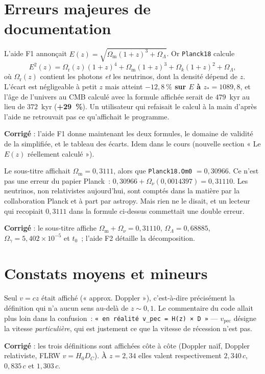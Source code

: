 \documentclass[11pt,a4paper]{report}
\newcommand{\Ok}{\Omega_{k}}
\newcommand{\Om}{\Omega_{\mathrm{m}}}
\newcommand{\OL}{\Omega_{\Lambda}}
\newcommand{\Or}{\Omega_{\mathrm{r}}}
\newcommand{\Hzero}{H_{0}}
\begin{document}
\section{Erreurs majeures de documentation}

\begin{tcolorbox}[majeur,title={P1 --- la formule $E(z)$ affichée n'est pas celle utilisée}]
L'aide F1 annonçait
$E(z) = \sqrt{\Om(1+z)^{3} + \OL}$. Or \texttt{Planck18} calcule
\[
E^{2}(z) = \Or(z)(1+z)^{4} + \Om(1+z)^{3} + \Ok(1+z)^{2} + \OL ,
\]
où $\Or(z)$ contient les photons \emph{et} les neutrinos, dont la densité
dépend de $z$. L'écart est négligeable à petit $z$ mais atteint
\textbf{$-12{,}8~\%$ sur $E$ à $z_{*} = 1089{,}8$}, et l'âge de l'univers au CMB
calculé avec la formule affichée serait de $479$~kyr au lieu de $372$~kyr
(\textbf{+29~\%}). Un utilisateur qui refaisait le calcul à la main d'après
l'aide ne retrouvait pas ce qu'affichait le programme.

\medskip
\textbf{Corrigé} : l'aide F1 donne maintenant les deux formules, le domaine de
validité de la simplifiée, et le tableau des écarts. Idem dans le cours
(nouvelle section « Le $E(z)$ réellement calculé »).
\end{tcolorbox}

\begin{tcolorbox}[majeur,title={P2 --- « $\Om = 0{,}3111$ » n'est pas le $\Om$ du backend}]
Le sous-titre affichait $\Om = 0{,}3111$, alors que
\texttt{Planck18.Om0} $= 0{,}30966$. Ce n'est pas une erreur du papier Planck~:
$0{,}30966 + \Omega_{\nu}(0{,}0014397) = 0{,}31110$. Les neutrinos, non
relativistes aujourd'hui, sont comptés dans la matière par la collaboration
Planck et à part par astropy. Mais rien ne le disait, et un lecteur qui
recopiait $0{,}3111$ dans la formule ci-dessus commettait une double erreur.

\medskip
\textbf{Corrigé} : le sous-titre affiche
$\Om + \Omega_{\nu} = 0{,}31110$, $\OL = 0{,}68885$, $\Omega_{\gamma} =
5{,}402\times10^{-5}$ et $t_{0}$~; l'aide F2 détaille la décomposition.
\end{tcolorbox}

\section{Constats moyens et mineurs}

\begin{tcolorbox}[moyen,title={P3 --- une seule vitesse de récession, et c'était la moins bonne}]
Seul $v = cz$ était affiché (« approx. Doppler »), c'est-à-dire précisément la
définition qui n'a aucun sens au-delà de $z\sim0{,}1$. Le commentaire du code
allait plus loin dans la confusion~: \texttt{« en réalité v\_pec = H(z) × D »}
--- $v_{\text{pec}}$ désigne la vitesse \emph{particulière}, qui est justement
ce que la vitesse de récession n'est pas.

\medskip
\textbf{Corrigé} : les trois définitions sont affichées côte à côte
(Doppler naïf, Doppler relativiste, FLRW $v = \Hzero D_{C}$). À $z = 2{,}34$
elles valent respectivement $2{,}340\,c$, $0{,}835\,c$ et $1{,}303\,c$.
\end{tcolorbox}
\end{document}
